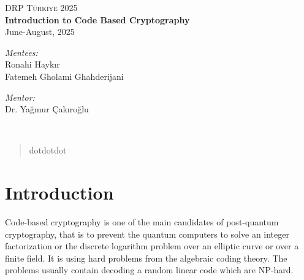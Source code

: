 \documentclass[a4paper,11pt]{article}
\theoremstyle{definition}
\begin{document}
\begin{titlepage}
\vbox{ }

\vbox{ }

\begin{center}
\textsc{\LARGE DRP Türkiye 2025}\\[1.5cm]

\vbox{ }
{ \huge \bfseries Introduction to Code Based Cryptography}\\[0.5cm]
{\large June-August, 2025}\\[0.5cm]
\begin{minipage}{0.5\textwidth}
\begin{flushleft} \large
\emph{Mentees:}\\
Ronahi Haykır\\ 
Fatemeh Gholami Ghahderijani 
\end{flushleft}
\end{minipage}
\begin{minipage}{0.4\textwidth}
\begin{flushright} \large
\emph{Mentor:} \\
Dr. Yağmur Çakıroğlu\\
\end{flushright}
\end{minipage}
\\[2cm]
\begin{abstract}
dotdotdot    
\end{abstract}

\vfill
\end{center}
\end{titlepage}

\thispagestyle{empty}
\newpage
\null
\thispagestyle{empty}
\newpage

\tableofcontents

\thispagestyle{empty}
\newpage
\null
\thispagestyle{empty}
\newpage

\section{Introduction}
Code-based cryptography is one of the main candidates of post-quantum cryptography, that is to prevent the quantum computers to solve an integer factorization or the discrete logarithm problem over an elliptic curve or over a finite field. It is using hard problems from the algebraic coding theory. The problems usually contain decoding a random linear code which are NP-hard.
\end{document}
